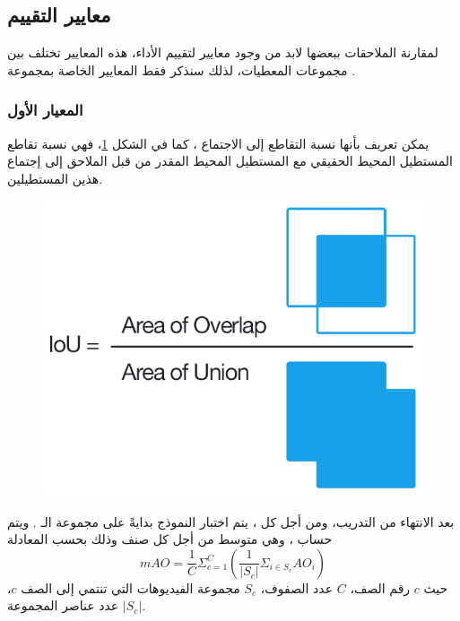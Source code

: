 \subsection{معايير التقييم
\label{section:benchmark}
}
لمقارنة الملاحقات ببعضها لابد من وجود معايير لتقييم الأداء، هذه المعايير تختلف بين مجموعات المعطيات، لذلك سنذكر فقط المعايير الخاصة بمجموعة 
.
\subsubsection{المعيار الأول
}
يمكن تعريف 
بأنها نسبة التقاطع إلى الاجتماع
،
كما في الشكل
\ref{fig:iou}، 
فهي نسبة تقاطع المستطيل المحيط الحقيقي مع المستطيل المحيط المقدر من قبل الملاحق إلى إجتماع هذين المستطيلين.
\newline
\begin{figure}[H]
	\centerline{\includegraphics[scale=0.25]{images/iou_equation}}
	\caption{
		}
	\label{fig:iou}
\end{figure}
بعد الانتهاء من التدريب، ومن أجل كل 
،
يتم اختبار النموذج بدايةً على مجموعة الـ 
.
ويتم حساب 
،
وهي متوسط 
من أجل كل صنف وذلك بحسب المعادلة
\begin{equation}
mAO = \frac{1}{C} \Sigma_{c=1}^C(\frac{1}{|S_c|} \Sigma_{i \in S_c}AO_i)
\end{equation}
حيث $c$ رقم الصف، $C$ عدد الصفوف، $S_c$ مجموعة الفيديوهات التي تنتمي إلى الصف $c$،
 $|S_c|$
عدد عناصر المجموعة.
